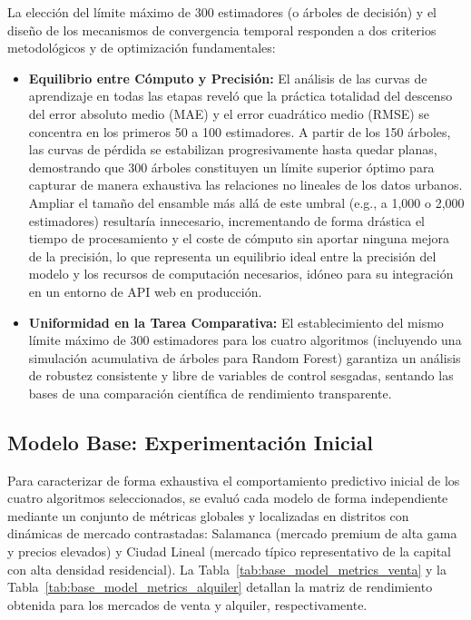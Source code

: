 \documentclass[a4paper,11pt,openany]{book}
\begin{document}
La elección del límite máximo de 300 estimadores (o árboles de decisión) y el diseño de los mecanismos de convergencia temporal responden a dos criterios metodológicos y de optimización fundamentales:
\begin{itemize}
    \item \textbf{Equilibrio entre Cómputo y Precisión:} El análisis de las curvas de aprendizaje en todas las etapas reveló que la práctica totalidad del descenso del error absoluto medio (MAE) y el error cuadrático medio (RMSE) se concentra en los primeros 50 a 100 estimadores. A partir de los 150 árboles, las curvas de pérdida se estabilizan progresivamente hasta quedar planas, demostrando que 300 árboles constituyen un límite superior óptimo para capturar de manera exhaustiva las relaciones no lineales de los datos urbanos. Ampliar el tamaño del ensamble más allá de este umbral (e.g., a 1,000 o 2,000 estimadores) resultaría innecesario, incrementando de forma drástica el tiempo de procesamiento y el coste de cómputo sin aportar ninguna mejora de la precisión, lo que representa un equilibrio ideal entre la precisión del modelo y los recursos de computación necesarios, idóneo para su integración en un entorno de API web en producción.
    \item \textbf{Uniformidad en la Tarea Comparativa:} El establecimiento del mismo límite máximo de 300 estimadores para los cuatro algoritmos (incluyendo una simulación acumulativa de árboles para Random Forest) garantiza un análisis de robustez consistente y libre de variables de control sesgadas, sentando las bases de una comparación científica de rendimiento transparente.
\end{itemize}

\subsection{Modelo Base: Experimentación Inicial}
Para caracterizar de forma exhaustiva el comportamiento predictivo inicial de los cuatro algoritmos seleccionados, se evaluó cada modelo de forma independiente mediante un conjunto de métricas globales y localizadas en distritos con dinámicas de mercado contrastadas: Salamanca (mercado premium de alta gama y precios elevados) y Ciudad Lineal (mercado típico representativo de la capital con alta densidad residencial). La Tabla~\ref{tab:base_model_metrics_venta} y la Tabla~\ref{tab:base_model_metrics_alquiler} detallan la matriz de rendimiento obtenida para los mercados de venta y alquiler, respectivamente.
\end{document}
